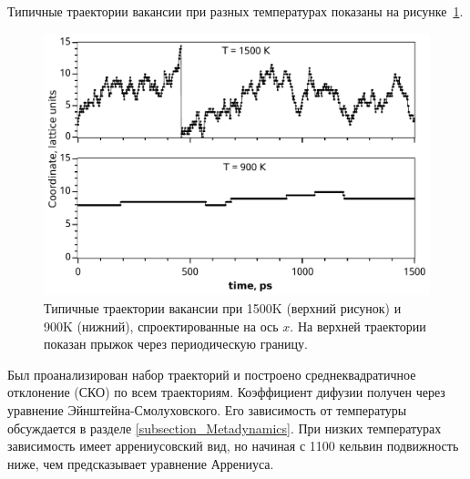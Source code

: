 \documentclass[master,14pt,subf,href,colorlinks=true
]{disser}
\begin{document}
Типичные траектории вакансии при разных температурах показаны на рисунке~\ref{graph_trajectories}.
\begin{figure}[h]
	\begin{center}
		\includegraphics[width=1.\linewidth]{Trajectories.pdf}
	\end{center}
\caption{Типичные траектории вакансии при 1500K (верхний рисунок) и 900K (нижний), спроектированные на ось $x$. На верхней траектории показан прыжок через периодическую границу.}\label{graph_trajectories}
\end{figure}
Был проанализирован набор траекторий и построено среднеквадратичное отклонение (СКО) по всем траекториям. Коэффициент дифузии получен через уравнение Эйнштейна-Смолуховского. Его зависимость от температуры обсуждается в разделе \ref{subsection_Metadynamics}. При низких температурах зависимость имеет аррениусовский вид, но начиная с 1100 кельвин подвижность ниже, чем предсказывает уравнение Аррениуса.
\end{document}
